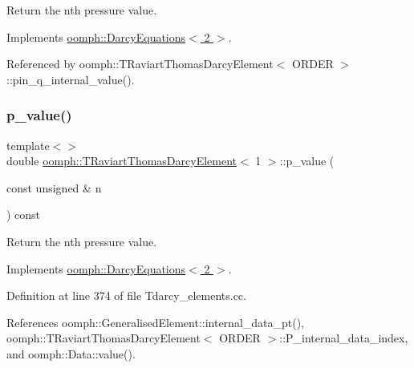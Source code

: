 Return the nth pressure value. 



Implements \hyperlink{classoomph_1_1DarcyEquations_a788824ffa37b4fcae4d45eee75f2c39e}{oomph\+::\+Darcy\+Equations$<$ 2 $>$}.



Referenced by oomph\+::\+T\+Raviart\+Thomas\+Darcy\+Element$<$ O\+R\+D\+E\+R $>$\+::pin\+\_\+q\+\_\+internal\+\_\+value().

\mbox{\label{classoomph_1_1TRaviartThomasDarcyElement_ab99e0a8bb2f6ba44dc4e54e0c2fda887}} 
\subsubsection{\texorpdfstring{p\+\_\+value()}{p\_value()}\hspace{0.1cm}{\footnotesize\ttfamily [3/3]}}
{\footnotesize\ttfamily template$<$$>$ \\
double \hyperlink{classoomph_1_1TRaviartThomasDarcyElement}{oomph\+::\+T\+Raviart\+Thomas\+Darcy\+Element}$<$ 1 $>$\+::p\+\_\+value (\begin{DoxyParamCaption}\item[{const unsigned \&}]{n }\end{DoxyParamCaption}) const\hspace{0.3cm}{\ttfamily [virtual]}}



Return the nth pressure value. 



Implements \hyperlink{classoomph_1_1DarcyEquations_a788824ffa37b4fcae4d45eee75f2c39e}{oomph\+::\+Darcy\+Equations$<$ 2 $>$}.



Definition at line 374 of file Tdarcy\+\_\+elements.\+cc.



References oomph\+::\+Generalised\+Element\+::internal\+\_\+data\+\_\+pt(), oomph\+::\+T\+Raviart\+Thomas\+Darcy\+Element$<$ O\+R\+D\+E\+R $>$\+::\+P\+\_\+internal\+\_\+data\+\_\+index, and oomph\+::\+Data\+::value().

\mbox{\label{classoomph_1_1TRaviartThomasDarcyElement_ae7a875ecb7a63af9ab75051d9f5b1839}} 
